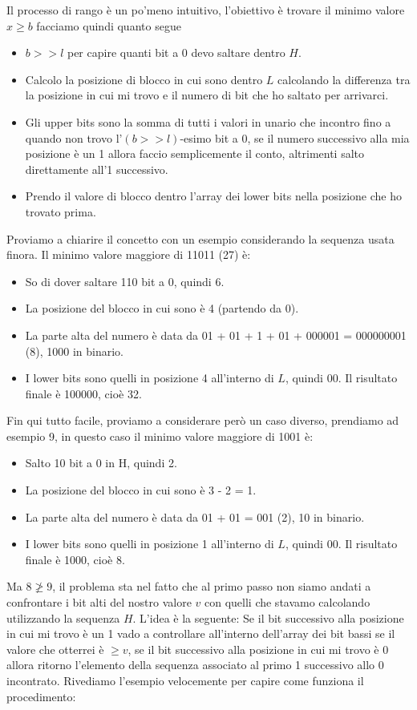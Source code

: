 Il processo di rango è un po'meno intuitivo, l'obiettivo è trovare il minimo valore $x \geq b$ facciamo quindi quanto segue
\begin{itemize}
	\item $b >> l$ per capire quanti bit a 0 devo saltare dentro $H$.
	\item Calcolo la posizione di blocco in cui sono dentro $L$ calcolando la differenza tra la posizione in cui mi trovo e il numero di bit che ho saltato per arrivarci.
	\item Gli upper bits sono la somma di tutti i valori in unario che incontro fino a quando non trovo l'$(b >> l)$-esimo bit a 0, se il numero successivo alla mia posizione è un 1 allora faccio semplicemente il conto, altrimenti salto direttamente all'1 successivo.
	\item Prendo il valore di blocco dentro l'array dei lower bits nella posizione che ho trovato prima.
\end{itemize}
Proviamo a chiarire il concetto con un esempio considerando la sequenza usata finora. Il minimo valore maggiore di 11011 (27) è:
\begin{itemize}
	\item So di dover saltare 110 bit a 0, quindi 6.
	\item La posizione del blocco in cui sono è 4 (partendo da 0).
	\item La parte alta del numero è data da 01 + 01 + 1 + 01 + 000001 = 000000001 (8), 1000 in binario.
	\item I lower bits sono quelli in posizione 4 all'interno di $L$, quindi 00. Il risultato finale è 100000, cioè 32.
\end{itemize}
Fin qui tutto facile, proviamo a considerare però un caso diverso, prendiamo ad esempio 9, in questo caso il minimo valore maggiore di 1001 è:
\begin{itemize}
	\item Salto 10 bit a 0 in H, quindi 2.
	\item La posizione del blocco in cui sono è 3 - 2 = 1.
	\item La parte alta del numero è data da 01 + 01 = 001 (2), 10 in binario.
	\item I lower bits sono quelli in posizione 1 all'interno di $L$, quindi 00. Il risultato finale è 1000, cioè 8.
\end{itemize}
Ma $8 \ngeq 9$, il problema sta nel fatto che al primo passo non siamo andati a confrontare i bit alti del nostro valore $v$ con quelli che stavamo calcolando utilizzando la sequenza $H$. L'idea è la seguente: Se il bit successivo alla posizione in cui mi trovo è un 1 vado a controllare all'interno dell'array dei bit bassi se il valore che otterrei è $\geq v$, se il bit successivo alla posizione in cui mi trovo è 0 allora ritorno l'elemento della sequenza associato al primo 1 successivo allo 0 incontrato. Rivediamo l'esempio velocemente per capire come funziona il procedimento:
